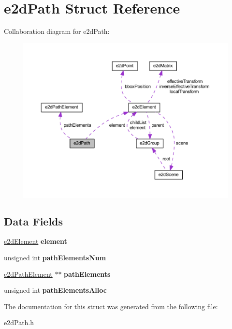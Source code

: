 \hypertarget{structe2dPath}{\section{e2d\-Path Struct Reference}
\label{structe2dPath}
}


Collaboration diagram for e2d\-Path\-:
\nopagebreak
\begin{figure}[H]
\begin{center}
\leavevmode
\includegraphics[width=350pt]{structe2dPath__coll__graph}
\end{center}
\end{figure}
\subsection*{Data Fields}
\begin{DoxyCompactItemize}
\item 
\hypertarget{structe2dPath_a55bc7a3a0af41fba9e5b91f390c5928c}{\hyperlink{structe2dElement}{e2d\-Element} {\bfseries element}}\label{structe2dPath_a55bc7a3a0af41fba9e5b91f390c5928c}

\item 
\hypertarget{structe2dPath_a225f71916c061d0c977a1e5fae371a99}{unsigned int {\bfseries path\-Elements\-Num}}\label{structe2dPath_a225f71916c061d0c977a1e5fae371a99}

\item 
\hypertarget{structe2dPath_ac0c8a45ff4f8d02e557fb33887743439}{\hyperlink{structe2dPathElement}{e2d\-Path\-Element} $\ast$$\ast$ {\bfseries path\-Elements}}\label{structe2dPath_ac0c8a45ff4f8d02e557fb33887743439}

\item 
\hypertarget{structe2dPath_a0922122c6ccf006fad850c6b30ae5328}{unsigned int {\bfseries path\-Elements\-Alloc}}\label{structe2dPath_a0922122c6ccf006fad850c6b30ae5328}

\end{DoxyCompactItemize}


The documentation for this struct was generated from the following file\-:\begin{DoxyCompactItemize}
\item 
e2d\-Path.\-h\end{DoxyCompactItemize}
